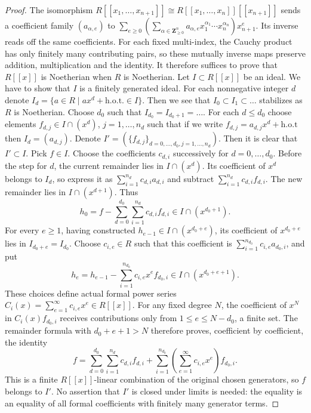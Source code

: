 \begin{proof}
The isomorphism
$R[[x_1,\ldots,x_{n+1}]]\cong R[[x_1,\ldots,x_n]][[x_{n+1}]]$
sends a coefficient family $(a_{\alpha,e})$ to
$\sum_{e\geq0}(\sum_{\alpha\in\mathbf Z_{\geq0}^n}a_{\alpha,e}
x_1^{\alpha_1}\cdots x_n^{\alpha_n})x_{n+1}^e$.
Its inverse reads off the same coefficients. For each fixed
multi-index, the Cauchy product has only finitely many contributing
pairs, so these mutually inverse maps preserve addition, multiplication
and the identity. It therefore suffices to prove that $R[[x]]$ is
Noetherian when $R$ is Noetherian. Let $I\subset R[[x]]$ be an ideal.
We have to show that $I$ is a finitely generated ideal.
For each nonnegative integer
$d$ denote $I_d = \{a \in R \mid ax^d + \text{h.o.t.} \in I\}$.
Then we see that $I_0 \subset I_1 \subset \ldots$ stabilizes as $R$
is Noetherian. Choose $d_0$ such that $I_{d_0} = I_{d_0 + 1} = \ldots$.
For each $d \leq d_0$ choose elements $f_{d, j} \in I \cap (x^d)$,
$j = 1, \ldots, n_d$ such that if we write
$f_{d, j} = a_{d, j}x^d + \text{h.o.t}$ then $I_d = (a_{d, j})$.
Denote $I' = (\{f_{d, j}\}_{d = 0, \ldots, d_0, j = 1, \ldots, n_d})$.
Then it is clear that $I' \subset I$. Pick $f \in I$.
Choose the coefficients $c_{d,i}$ successively for $d=0,\ldots,d_0$.
Before the step for $d$, the current remainder lies in $I\cap(x^d)$.
Its coefficient of $x^d$ belongs to $I_d$, so express it as
$\sum_{i=1}^{n_d}c_{d,i}a_{d,i}$ and subtract
$\sum_{i=1}^{n_d}c_{d,i}f_{d,i}$. The new remainder lies in
$I\cap(x^{d+1})$. Thus
$$
h_0=f-\sum_{d=0}^{d_0}\sum_{i=1}^{n_d}c_{d,i}f_{d,i}
\in I\cap(x^{d_0+1}).
$$
For every $e\geq1$, having constructed
$h_{e-1}\in I\cap(x^{d_0+e})$, its coefficient of $x^{d_0+e}$
lies in $I_{d_0+e}=I_{d_0}$. Choose $c_{i,e}\in R$ such that this
coefficient is $\sum_{i=1}^{n_{d_0}}c_{i,e}a_{d_0,i}$, and put
$$
h_e=h_{e-1}-\sum_{i=1}^{n_{d_0}}c_{i,e}x^e f_{d_0,i}
\in I\cap(x^{d_0+e+1}).
$$
These choices define actual formal power series
$C_i(x)=\sum_{e=1}^\infty c_{i,e}x^e\in R[[x]]$.
For any fixed degree $N$, the coefficient of $x^N$ in
$C_i(x)f_{d_0,i}$ receives contributions only from
$1\leq e\leq N-d_0$, a finite set. The remainder formula with
$d_0+e+1>N$ therefore proves, coefficient by coefficient, the identity
$$
f=\sum_{d=0}^{d_0}\sum_{i=1}^{n_d}c_{d,i}f_{d,i}
 +\sum_{i=1}^{n_{d_0}}\left(\sum_{e=1}^\infty c_{i,e}x^e\right)f_{d_0,i}.
$$
This is a finite $R[[x]]$-linear combination of the original chosen
generators, so $f$ belongs to $I'$. No assertion that $I'$ is closed
under limits is needed: the equality is an equality of all formal
coefficients with finitely many generator terms.
\end{proof}

